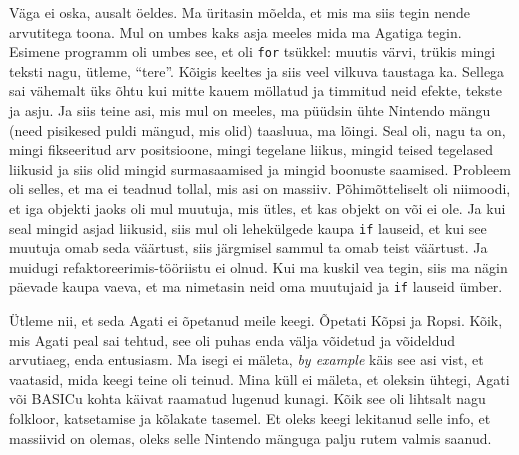 Väga ei oska, ausalt öeldes. Ma üritasin mõelda, et mis ma siis tegin nende 
arvutitega toona. Mul on umbes kaks asja meeles mida ma Agatiga tegin. Esimene 
programm oli umbes see, et oli \verb|for| tsükkel: muutis värvi, trükis mingi 
teksti nagu, ütleme, \enquote{tere}. Kõigis keeltes ja siis veel vilkuva 
taustaga ka. Sellega sai vähemalt üks õhtu kui mitte kauem möllatud ja timmitud 
neid efekte, tekste ja asju. Ja siis teine asi, mis mul on meeles, ma püüdsin 
ühte Nintendo mängu (need pisikesed puldi mängud, mis olid) taasluua, ma 
lõingi. Seal oli, nagu ta on, mingi fikseeritud arv positsioone, mingi tegelane 
liikus, mingid teised tegelased liikusid ja siis olid mingid surmasaamised ja 
mingid boonuste saamised. Probleem oli selles, et ma ei teadnud tollal, mis asi 
on massiiv. Põhimõtteliselt oli niimoodi, et iga objekti jaoks oli mul muutuja, 
mis ütles, et kas objekt on või ei ole. Ja kui seal mingid asjad liikusid, siis 
mul oli lehekülgede kaupa \verb|if| lauseid, et kui see muutuja omab seda 
väärtust, siis järgmisel sammul ta omab teist väärtust. Ja muidugi 
refaktoreerimis-tööriistu ei olnud. Kui ma kuskil vea tegin, siis ma nägin 
päevade kaupa vaeva, et ma nimetasin neid oma muutujaid ja \verb|if| lauseid 
ümber.



Ütleme nii, et seda Agati ei õpetanud meile keegi. Õpetati 
Kõpsi ja Ropsi. Kõik, mis Agati peal sai tehtud, see oli puhas enda välja 
võidetud ja võideldud  arvutiaeg, enda entusiasm. Ma isegi ei mäleta, \emph{by 
example} käis see asi vist, et vaatasid, mida keegi teine oli teinud. Mina küll 
ei mäleta, et oleksin ühtegi, Agati või BASICu  kohta 
käivat raamatud lugenud kunagi. Kõik see oli lihtsalt nagu folkloor, 
katsetamise ja kõlakate tasemel. Et oleks keegi lekitanud selle info, et 
massiivid on olemas, oleks selle Nintendo mänguga palju rutem valmis saanud. 


